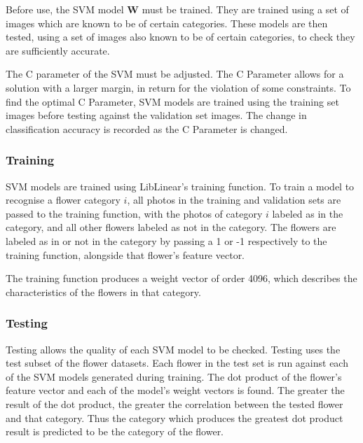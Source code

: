 \documentclass[11pt, a4paper]{report}
\newcommand{\vect}[1]{\boldsymbol{#1}}
\begin{document}
Before use, the SVM model $\vect{W}$ must be trained. They are trained using a set of images which are known to be of certain categories. These models are then tested, using a set of images also known to be of certain categories, to check they are sufficiently accurate. 

The C parameter of the SVM must be adjusted. The C Parameter allows for a solution with a larger margin, in return for the violation of some constraints. To find the optimal C Parameter, SVM models are trained using the training set images  before testing against the validation set images. The change in classification accuracy is recorded as the C Parameter is changed. 



\subsubsection{Training} 

SVM models are trained using LibLinear's training function. To train a model to recognise a flower category $i$, all photos in the training and validation sets are passed to the training function, with the photos of category $i$ labeled as in the category, and all other flowers labeled as not in the category. The flowers are labeled as in or not in the category by passing a 1 or -1 respectively to the training function, alongside that flower's feature vector.

The training function produces a weight vector of order 4096, which describes the characteristics of the flowers in that category. %

\subsubsection{Testing}

Testing allows the quality of each SVM model to be checked. Testing uses the test subset of the flower datasets. Each flower in the test set is run against each of the SVM models generated during training. The dot product of the  flower's feature vector and each of the model's weight vectors is found. The greater the result of the dot product, the greater the correlation between the tested flower and that category. Thus the category which produces the greatest dot product result is predicted to be the category of the flower.
\end{document}

